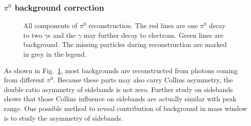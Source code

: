 \subsubsection{\texorpdfstring {$\pi^0$ background correction}{pi0 background correction}}
\label{sec:pi0bkgcorrection}
\begin{figure}[H]
  \centering     
  \caption{All components of $\pi^0$ reconstruction. The red lines are one $\pi^0$ decay to two $\gamma$s and the $\gamma$ may further decay to electrons. Green lines are background. The missing particles during reconstruction are marked in grey in the legend.}
  \label{fig:pi0_component}
\end{figure}
As shown in Fig.~\ref{fig:pi0_component}, most backgrounds are reconstructed from photons coming from different $\pi^0$. Because these parts may also carry Collins asymmetry, the double ratio asymmetry of sidebands is not zero. Further study on sidebands shows that those Collins influence on sidebands are actually similar with peak range. One possible method to reveal contribution of background in mass window is to study the asymmetry of sidebands. 

